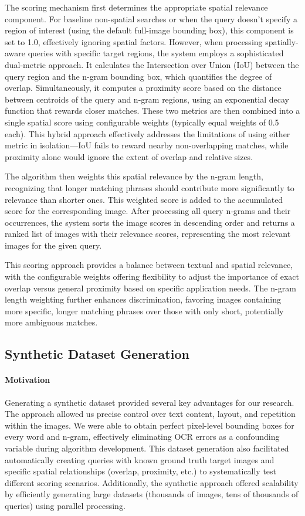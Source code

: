 \documentclass[manuscript,screen]{acmart}
\begin{document}
The scoring mechanism first determines the appropriate spatial relevance component. For baseline non-spatial searches or when the query doesn't specify a region of interest (using the default full-image bounding box), this component is set to 1.0, effectively ignoring spatial factors. However, when processing spatially-aware queries with specific target regions, the system employs a sophisticated dual-metric approach. It calculates the Intersection over Union (IoU) between the query region and the n-gram bounding box, which quantifies the degree of overlap. Simultaneously, it computes a proximity score based on the distance between centroids of the query and n-gram regions, using an exponential decay function that rewards closer matches. These two metrics are then combined into a single spatial score using configurable weights (typically equal weights of 0.5 each). This hybrid approach effectively addresses the limitations of using either metric in isolation—IoU fails to reward nearby non-overlapping matches, while proximity alone would ignore the extent of overlap and relative sizes.

The algorithm then weights this spatial relevance by the n-gram length, recognizing that longer matching phrases should contribute more significantly to relevance than shorter ones. This weighted score is added to the accumulated score for the corresponding image. After processing all query n-grams and their occurrences, the system sorts the image scores in descending order and returns a ranked list of images with their relevance scores, representing the most relevant images for the given query.

This scoring approach provides a balance between textual and spatial relevance, with the configurable weights offering flexibility to adjust the importance of exact overlap versus general proximity based on specific application needs. The n-gram length weighting further enhances discrimination, favoring images containing more specific, longer matching phrases over those with only short, potentially more ambiguous matches.

\subsection{Synthetic Dataset Generation}

\paragraph{Motivation} Generating a synthetic dataset provided several key advantages for our research. The approach allowed us precise control over text content, layout, and repetition within the images. We were able to obtain perfect pixel-level bounding boxes for every word and n-gram, effectively eliminating OCR errors as a confounding variable during algorithm development. This dataset generation also facilitated automatically creating queries with known ground truth target images and specific spatial relationships (overlap, proximity, etc.) to systematically test different scoring scenarios. Additionally, the synthetic approach offered scalability by efficiently generating large datasets (thousands of images, tens of thousands of queries) using parallel processing.
\end{document}
